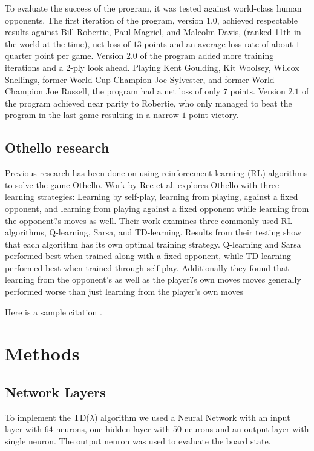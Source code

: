 \documentclass{sig-alternate-05-2015}
\begin{document}
To evaluate the success of the program, it was tested against world-class human opponents. The first iteration of the program, version $1.0$, achieved respectable results against Bill Robertie, Paul Magriel, and Malcolm Davis, (ranked 11th in the world at the time), net loss of $13$ points and an average loss rate of about $1$ quarter point per game. Version $2.0$ of the program added more training iterations and a 2-ply look ahead. Playing Kent Goulding, Kit Woolsey, Wilcox Snellings, former World Cup Champion Joe Sylvester, and former World Champion Joe Russell, the program had a net loss of only $7$ points. Version $2.1$ of the program achieved near parity to Robertie, who only managed to beat the program in the last game resulting in a narrow $1$-point victory.

\subsection{Othello research}

Previous research has been done on using reinforcement learning (RL) algorithms to solve the game Othello. Work by Ree et al. explores Othello with three learning strategies: Learning by self-play, learning from playing, against a fixed opponent, and learning from playing against a fixed opponent while learning from the opponent?s moves as well. Their work examines three commonly used RL algorithms, Q-learning, Sarsa, and TD-learning. Results from their testing show that each algorithm has its own optimal training strategy. Q-learning and Sarsa performed best when trained along with a fixed opponent, while TD-learning performed best when trained through self-play. Additionally they found that learning from the opponent's as well as the player?s own moves moves generally performed worse than just learning from the player's own moves


Here is a sample citation \cite{sutton1998reinforcement}.

\section{Methods}

\subsection{Network Layers}
 
To implement the TD(\(\lambda\)) algorithm we used a Neural Network with an input layer with $64$ neurons, one hidden layer with $50$ neurons and an output layer with single neuron. The output neuron was used to evaluate the board state.
\end{document}
